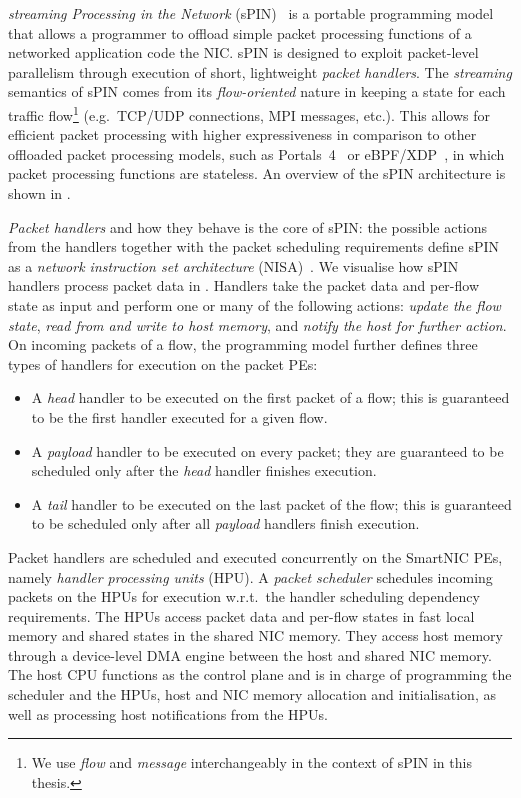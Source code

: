 \emph{streaming Processing in the Network} (sPIN)~\cite{hoefler_spin_2017} is a portable programming model that allows a programmer to offload simple packet processing functions of a networked application code the NIC.  sPIN is designed to exploit packet-level parallelism through execution of short, lightweight \textit{packet handlers}.  The \emph{streaming} semantics of sPIN comes from its \emph{flow-oriented} nature in keeping a state for each traffic flow\footnote{We use \emph{flow} and \emph{message} interchangeably in the context of sPIN in this thesis.} (e.g.\ TCP/UDP connections, MPI messages, etc.).  This allows for efficient packet processing with higher expressiveness in comparison to other offloaded packet processing models, such as Portals~4~\cite{bosshart_p4_2014} or eBPF/XDP~\cite{vieira_fast_2021}, in which packet processing functions are stateless.  An overview of the sPIN architecture is shown in .

\emph{Packet handlers} and how they behave is the core of sPIN: the possible actions from the handlers together with the packet scheduling requirements define sPIN as a \emph{network instruction set architecture} (NISA)~\cite{hoefler_spin_2017}.  We visualise how sPIN handlers process packet data in .  Handlers take the packet data and per-flow state as input and perform one or many of the following actions: \emph{update the flow state}, \emph{read from and write to host memory}, and \emph{notify the host for further action}.  On incoming packets of a flow, the programming model further defines three types of handlers for execution on the packet PEs:

\begin{itemize}
    \item A \emph{head} handler to be executed on the first packet of a flow; this is guaranteed to be the first handler executed for a given flow.
    \item A \emph{payload} handler to be executed on every packet; they are guaranteed to be scheduled only after the \emph{head} handler finishes execution.
    \item A \emph{tail} handler to be executed on the last packet of the flow; this is guaranteed to be scheduled only after all \emph{payload} handlers finish execution.
\end{itemize}

Packet handlers are scheduled and executed concurrently on the SmartNIC PEs, namely \emph{handler processing units} (HPU).  A \emph{packet scheduler} schedules incoming packets on the HPUs for execution w.r.t.\ the handler scheduling dependency requirements.  The HPUs access packet data and per-flow states in fast local memory and shared states in the shared NIC memory.  They access host memory through a device-level DMA engine between the host and shared NIC memory.  The host CPU functions as the control plane and is in charge of programming the scheduler and the HPUs, host and NIC memory allocation and initialisation, as well as processing host notifications from the HPUs.

